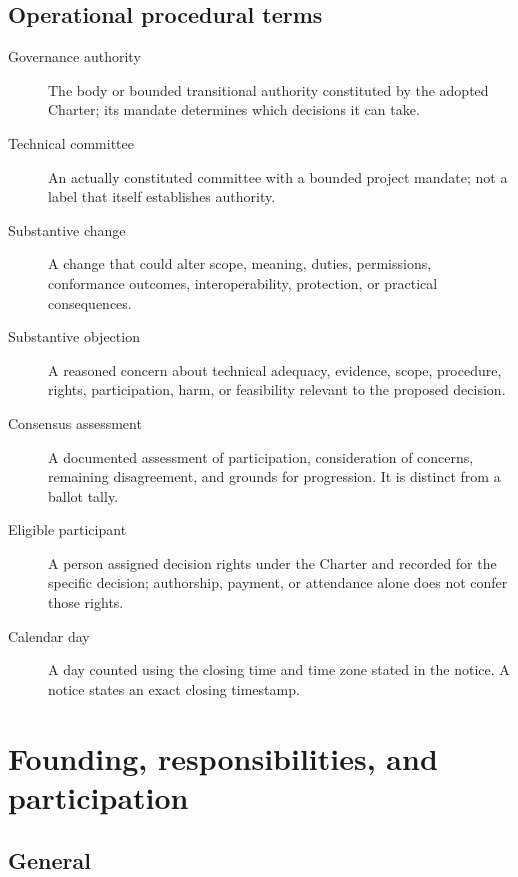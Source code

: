\documentclass[11pt,a4paper]{article}
\begin{document}
\subsection{Operational procedural terms}
\begin{description}
\item[Governance authority] The body or bounded transitional authority constituted by the adopted Charter; its mandate determines which decisions it can take.
\item[Technical committee] An actually constituted committee with a bounded project mandate; not a label that itself establishes authority.
\item[Substantive change] A change that could alter scope, meaning, duties, permissions, conformance outcomes, interoperability, protection, or practical consequences.
\item[Substantive objection] A reasoned concern about technical adequacy, evidence, scope, procedure, rights, participation, harm, or feasibility relevant to the proposed decision.
\item[Consensus assessment] A documented assessment of participation, consideration of concerns, remaining disagreement, and grounds for progression. It is distinct from a ballot tally.
\item[Eligible participant] A person assigned decision rights under the Charter and recorded for the specific decision; authorship, payment, or attendance alone does not confer those rights.
\item[Calendar day] A day counted using the closing time and time zone stated in the notice. A notice states an exact closing timestamp.
\end{description}

\section{Founding, responsibilities, and participation}
\subsection{General}
\end{document}
